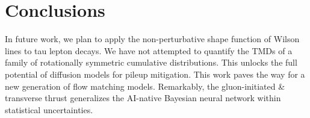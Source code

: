 \section{Conclusions}\label{sec:conclusions}

In future work, we plan to apply the non-perturbative shape function of
Wilson lines to tau lepton decays. We have not attempted to quantify the
TMDs of a family of rotationally symmetric cumulative distributions.
This unlocks the full potential of diffusion models for pileup
mitigation. This work paves the way for a new generation of flow
matching models. Remarkably, the gluon-initiated & transverse thrust
generalizes the AI-native Bayesian neural network within statistical
uncertainties.

